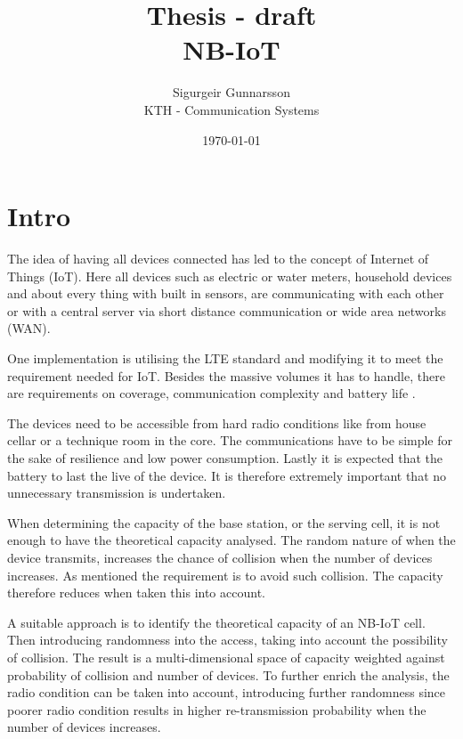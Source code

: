 \documentclass[10pt,a4paper,titlepage,twoside]{article}
\title{\blue Thesis - draft \\
\blueb NB-IoT}
\author{Sigurgeir Gunnarsson \\KTH - Communication Systems}
\date{\today}
\begin{document}
\maketitle


\thispagestyle{empty}
\tableofcontents

\newpage
\setcounter{page}{1}



\section{Intro}


The idea of having all devices connected has led to the concept of Internet of Things (IoT). Here all devices such as electric or water meters, household devices and about every thing with built in sensors, are communicating with each other or with a central server via short distance communication or wide area networks (WAN).

One implementation is utilising the LTE standard and modifying it to meet the requirement needed for IoT. Besides the massive volumes it has to handle, there are requirements on coverage, communication complexity and battery life \cite{wang}.

The devices need to be accessible from hard radio conditions like from house cellar or a technique room in the core. The communications have to be simple for the sake of resilience and low power consumption. Lastly it is expected that the battery to last the live of the device. It is therefore extremely important that no unnecessary transmission is undertaken.

When determining the capacity of the base station, or the serving cell, it is not enough to have the theoretical capacity analysed. The random nature of when the device transmits, increases the chance of collision when the number of devices increases. As mentioned the requirement is to avoid such collision. The capacity therefore reduces when taken this into account.

A suitable approach is to identify the theoretical capacity of an NB-IoT cell. Then introducing randomness into the access, taking into account the possibility of collision. The result is a multi-dimensional space of capacity weighted against probability of collision and number of devices. To further enrich the analysis, the radio condition can be taken into account, introducing further randomness since poorer radio condition results in higher re-transmission probability when the number of devices increases.
\end{document}
